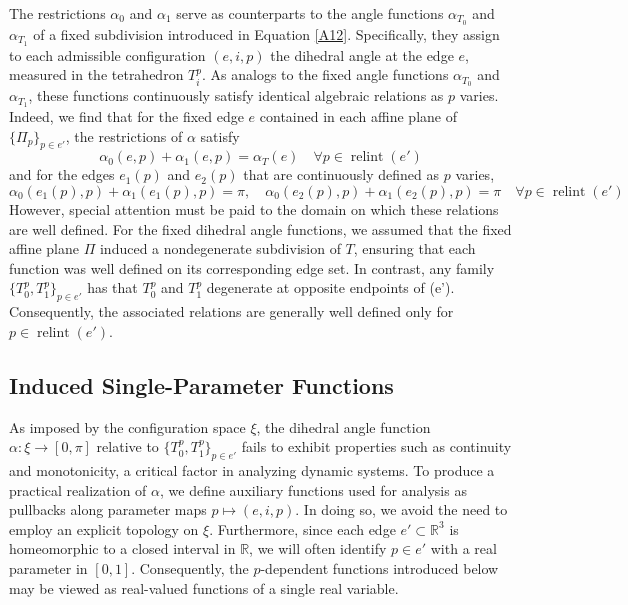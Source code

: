 \documentclass{mainresearch}
\begin{document}
The restrictions $\alpha_0$ and $\alpha_1$ serve as counterparts to the angle functions $\alpha_{T_0}$ and $\alpha_{T_1}$ of a fixed subdivision introduced in Equation \ref{A12}. Specifically, they assign to each admissible configuration $(e,i,p)$ the dihedral angle at the edge $e$, measured in the tetrahedron $T_i^p$. As analogs to the fixed angle functions $\alpha_{T_0}$ and $\alpha_{T_1}$, these functions continuously satisfy identical algebraic relations as $p$ varies. Indeed, we find that for the fixed edge $e$ contained in each affine plane of $\{\Pi_p\}_{p \in e'}$, the restrictions of $\alpha$ satisfy
\begin{equation}\label{ALG1}
	\alpha_{0}(e,p) + \alpha_{1}(e,p) = \alpha_T(e) \quad \forall p\in \operatorname{relint}(e')
\end{equation}
and for the edges $e_1(p)$ and $e_2(p)$ that are continuously defined as $p$ varies,
\begin{equation}\label{ALG2}
	\alpha_{0}(e_1(p),p) + \alpha_{1}(e_1(p),p) = \pi, \quad 
	\alpha_{0}(e_2(p),p) + \alpha_{1}(e_2(p),p) = \pi \quad \forall p\in \operatorname{relint}(e')
\end{equation}
However, special attention must be paid to the domain on which these relations are well defined. For the fixed dihedral angle functions, we assumed that the fixed affine plane $\Pi$ induced a nondegenerate subdivision of $T$, ensuring that each function was well defined on its corresponding edge set. In contrast, any family $\{T_0^p,T_1^p\}_{p \in e'}$ has that $T_0^p$ and $T_1^p$ degenerate at opposite endpoints of (e'). Consequently, the associated relations are generally well defined only for $p \in \operatorname{relint}(e')$.




\subsection{Induced Single-Parameter Functions}

As imposed by the configuration space $\xi$, the dihedral angle function $\alpha:\xi \to [0,\pi]$ relative to $\{T_0^p,T_1^p\}_{p\in e'}$ fails to exhibit properties such as continuity and monotonicity, a critical factor in analyzing dynamic systems. To produce a practical realization of $\alpha$, we define auxiliary functions used for analysis as pullbacks along parameter maps $p \mapsto (e,i,p)$. In doing so, we avoid the need to employ an explicit topology on $\xi$. Furthermore, since each edge $e' \subset \mathbb{R}^3$ is homeomorphic to a closed interval in $\mathbb{R}$, we will often identify $p \in e'$ with a real parameter in $[0,1]$. Consequently, the $p$-dependent functions introduced below may be viewed as real-valued functions of a single real variable.
\end{document}
